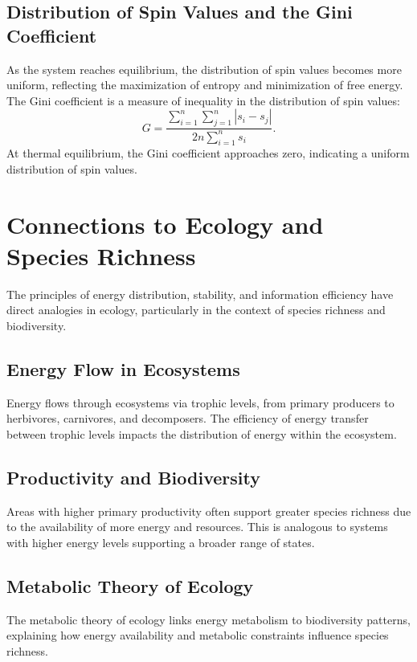 \documentclass{article}
\begin{document}
\subsection{Distribution of Spin Values and the Gini Coefficient}

As the system reaches equilibrium, the distribution of spin values becomes more uniform, reflecting the maximization of entropy and minimization of free energy. The Gini coefficient is a measure of inequality in the distribution of spin values:
\begin{equation}
G = \frac{\sum_{i=1}^{n} \sum_{j=1}^{n} |s_i - s_j|}{2n \sum_{i=1}^{n} s_i}.
\end{equation}
At thermal equilibrium, the Gini coefficient approaches zero, indicating a uniform distribution of spin values.

\section{Connections to Ecology and Species Richness}

The principles of energy distribution, stability, and information efficiency have direct analogies in ecology, particularly in the context of species richness and biodiversity.

\subsection{Energy Flow in Ecosystems}
Energy flows through ecosystems via trophic levels, from primary producers to herbivores, carnivores, and decomposers. The efficiency of energy transfer between trophic levels impacts the distribution of energy within the ecosystem.

\subsection{Productivity and Biodiversity}
Areas with higher primary productivity often support greater species richness due to the availability of more energy and resources. This is analogous to systems with higher energy levels supporting a broader range of states.

\subsection{Metabolic Theory of Ecology}
The metabolic theory of ecology links energy metabolism to biodiversity patterns, explaining how energy availability and metabolic constraints influence species richness.
\end{document}
